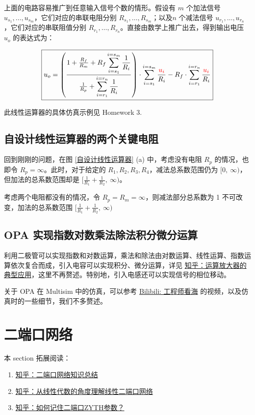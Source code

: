 \documentclass[UTF8]{report}
\theoremstyle{MyLineTheoremStyle} %
\theoremstyle{MyBlockTheoremStyle} %
\theoremstyle{MySubsubsectionStyle} %
\begin{document}
上面的电路容易推广到任意输入信号个数的情形。假设有 $m$ 个加法信号 $u_{s_1}, \dots, u_{s_m}$，它们对应的串联电阻分别 $R_{s_1}, \dots, R_{s_m}$；以及$n$ 个减法信号 $u_{r_1}, \dots, u_{r_n}$，它们对应的串联阻值分别 $R_{r_1}, \dots, R_{r_n}$。直接由数学上推广出去，得到输出电压 
$u_o$ 的表达式为：

\begin{equation}
\boxed{
u_o = 
\left(
    \frac{1 + \frac{R_f}{R_m} + \displaystyle R_f\sum_{i=s_1}^{i=s_m} \frac{1}{R_i}
    }{
        \frac{1}{R_p} + \displaystyle \sum_{i=r_1}^{i=r_n} \frac{1}{R_i}
    }
\right)\cdot \displaystyle\sum_{i=s_1}^{i=s_m} \frac{{\color{red} u_i}}{R_i}  - R_f \cdot  \displaystyle\sum_{i=r_1}^{i=r_n} \frac{{\color{red} u_i}}{R_i}
}
\end{equation}

此线性运算器的具体仿真示例见 Homework 3.

\subsection{自设计线性运算器的两个关键电阻}

回到刚刚的问题，在图 \ref{自设计线性运算器} (a) 中，考虑没有电阻 $R_p$ 的情况，也即令 $R_p = \infty$。此时，对于给定的 $R_1, R_2, R_3, R_4$，减法总系数范围仍为 $[0,\ \infty)$，但加法的总系数范围却是 $[\frac{1}{R_1} + \frac{1}{R_2} ,\ \infty)$。

考虑两个电阻都没有的情况，令 $R_p = R_m = \infty$，则减法部分总系数为 1 不可改变，加法的总系数范围 $[\frac{1}{R_1} + \frac{1}{R_2} ,\ \infty)$

\subsection{OPA 实现指数对数乘法除法积分微分运算}

利用二极管可以实现指数和对数运算，乘法和除法由对数运算、线性运算、指数运算依次复合而成，引入电容可以实现积分、微分运算，详见 \href{https://zhuanlan.zhihu.com/p/628064125}{知乎：运算放大器的典型应用}，这里不再赘述。特别地，引入电感还可以实现信号的相位移动。

关于 OPA 在 Multisim 中的仿真，可以参考 \href{https://space.bilibili.com/82683828}{Bilibili: 工程师看海} 的视频，以及仿真时的一些细节，我们不多赘述。

\section{二端口网络}

本 section 拓展阅读：
\begin{enumerate}
    \item \href{https://zhuanlan.zhihu.com/p/574470858}{知乎：二端口网络知识总结}
    \item \href{https://zhuanlan.zhihu.com/p/359677789}{知乎：从线性代数的角度理解线性二端口网络}
    \item \href{https://www.zhihu.com/question/357342024/answer/1477595759}{知乎：如何记住二端口ZYTH参数？}
\end{enumerate}
\end{document}
